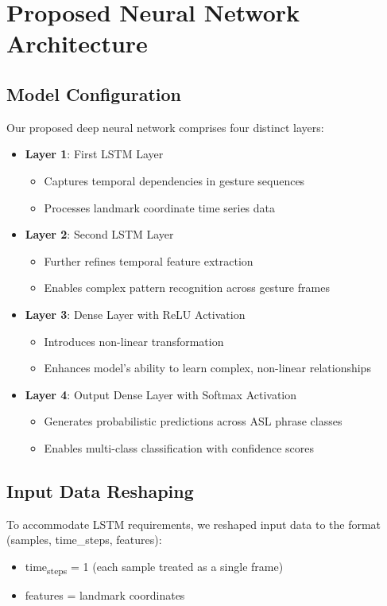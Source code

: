 \section{Proposed Neural Network Architecture}

\subsection{Model Configuration}
Our proposed deep neural network comprises four distinct layers:
\begin{itemize}
\item \textbf{\textbf{Layer 1}}: First LSTM Layer
\begin{itemize}
\item Captures temporal dependencies in gesture sequences
\item Processes landmark coordinate time series data
\end{itemize}

\item \textbf{\textbf{Layer 2}}: Second LSTM Layer
\begin{itemize}
\item Further refines temporal feature extraction
\item Enables complex pattern recognition across gesture frames
\end{itemize}

\item \textbf{\textbf{Layer 3}}: Dense Layer with ReLU Activation
\begin{itemize}
\item Introduces non-linear transformation
\item Enhances model's ability to learn complex, non-linear relationships
\end{itemize}

\item \textbf{\textbf{Layer 4}}: Output Dense Layer with Softmax Activation
\begin{itemize}
\item Generates probabilistic predictions across ASL phrase classes
\item Enables multi-class classification with confidence scores
\end{itemize}
\end{itemize}

\subsection{Input Data Reshaping}
To accommodate LSTM requirements, we reshaped input data to the format (samples, time_steps, features):
\begin{itemize}
\item time\textsubscript{steps} = 1 (each sample treated as a single frame)
\item features = landmark coordinates
\end{itemize}

